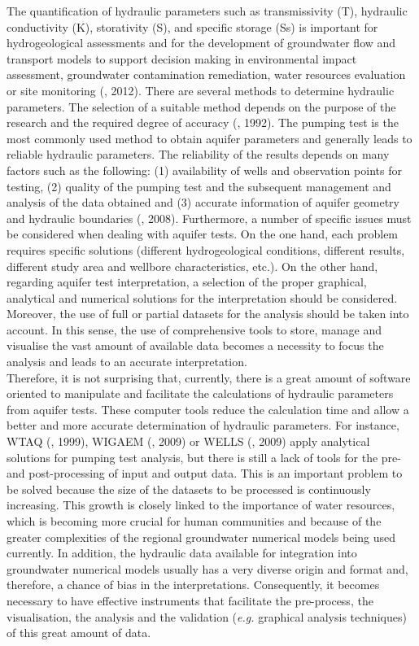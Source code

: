 The quantification of hydraulic parameters such as transmissivity (T), hydraulic conductivity (K), storativity (S), and specific storage (Ss) is important for hydrogeological assessments and for the development of groundwater flow and transport models to support decision making in environmental impact assessment, groundwater contamination remediation, water resources evaluation or site monitoring (\citeauthor{Rogiers2012EstimationNetworks}, 2012).
There are several methods to determine hydraulic parameters. The selection of a suitable method depends on the purpose of the research and the required degree of accuracy (\citeauthor{Vukovic1992DeterminationGrain-size}, 1992).  The pumping test is the most commonly used method to obtain aquifer parameters and generally leads to reliable hydraulic parameters. The reliability of the results depends on many factors such as the following: (1) availability of wells and observation points for testing, (2) quality of the pumping test and the subsequent management and analysis of the data obtained and (3) accurate information of aquifer geometry and hydraulic boundaries (\citeauthor{Cheong2008EstimatingKorea}, 2008). Furthermore, a number of specific issues must be considered when dealing with aquifer tests. On the one hand, each problem requires specific solutions (different hydrogeological conditions, different results, different study area and wellbore characteristics, etc.). On the other hand, regarding aquifer test interpretation, a selection of the proper graphical, analytical and numerical solutions for the interpretation should be considered. Moreover, the use of full or partial datasets for the analysis should be taken into account. In this sense, the use of comprehensive tools to store, manage and visualise the vast amount of available data becomes a necessity to focus the analysis and leads to an accurate interpretation.\\
Therefore, it is not surprising that, currently, there is a great amount of software oriented to manipulate and facilitate the calculations of hydraulic parameters from aquifer tests. These computer tools reduce the calculation time and allow a better and more accurate determination of hydraulic parameters. For instance, WTAQ (\citeauthor{Barlow1999WTAQAAquifers}, 1999), WIGAEM (\citeauthor{Bakker2009WigaemFlow}, 2009) or WELLS (\citeauthor{Vesselinov2009AnalyticalAquifer}, 2009) apply analytical solutions for pumping test analysis, but there is still a lack of tools for the pre- and post-processing of input and output data. This is an important problem to be solved because the size of the datasets to be processed is continuously increasing. This growth is closely linked to the importance of water resources, which is becoming more crucial for human communities and because of the greater complexities of the regional groundwater numerical models being used currently. In addition, the hydraulic data available for integration into groundwater numerical models usually has a very diverse origin and format and, therefore, a chance of bias in the interpretations. Consequently, it becomes necessary to have effective instruments that facilitate the pre-process, the visualisation, the analysis and the validation (\textit{e.g.} graphical analysis techniques) of this great amount of data.\\
